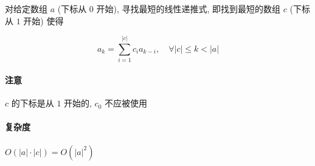 对给定数组 \(a\) (下标从 \(0\) 开始), 寻找最短的线性递推式, 即找到最短的数组 \(c\) (下标从 \(1\) 开始) 使得

\[
    a_k=\sum_{i=1}^{|c|} c_i a_{k-i},\quad \forall |c|\leq k < |a|
\]

\paragraph{注意}

\(c\) 的下标是从 \(1\) 开始的, \(c_0\) 不应被使用

\paragraph{复杂度} 

\(O(|a|\cdot |c|)=O\left(|a|^2\right)\)